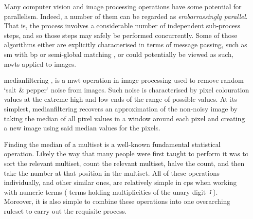 Many computer vision and image processing operations have some potential for parallelism.  Indeed, a number of them can be regarded as \emph{embarrassingly parallel}.  That is, the process involves a considerable number of independent sub-process steps, and so those steps may safely be performed concurrently.  Some of those algorithms either are explicitly characterised in terms of message passing, such as \gls{sm} with \gls{bp} \cite{Liang2011} or semi-global matching \cite{Drory2014}, or could potentially be viewed as such, \eg{} \glspl{mwt} applied to images.

\Gls{medianfilter}ing \cite[Chap. 3.4.1]{Gimelfarb2018}, \cite{Fisher2016} is a \gls{mwt} operation in image processing used to remove random `salt \& pepper' noise from images.  Such noise is characterised by pixel colouration values at the extreme high and low ends of the range of possible values.  At its simplest, \gls{medianfilter}ing recovers an approximation of the non-noisy image by taking the median of all pixel values in a window around each pixel and creating a new image using said median values for the pixels.

Finding the median of a multiset is a well-known fundamental statistical operation.  Likely the way that many people were first taught to perform it was to sort the relevant multiset, count the relevant multiset, halve the count, and then take the number at that position in the multiset.  All of these operations individually, and other similar ones, are relatively simple in \gls{cps} when working with numeric terms (\ie{} terms holding multiplicities of the unary digit \(\mathit{1}\)).  Moreover, it is also simple to combine these operations into one overarching \gls{ruleset} to carry out the requisite process.


